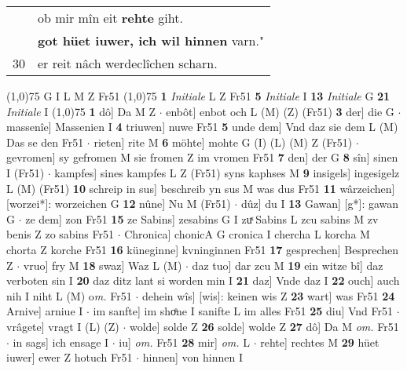 \documentclass[8pt,a4paper,notitlepage]{article}
\begin{document}
\begin{table}[ht]
\begin{minipage}[t]{0.5\linewidth}
\begin{tabular}{rl}
 & ob mir mîn eit \textbf{rehte} giht.\\ 
 & \textbf{got hüet iuwer, ich wil hinnen} varn."\\ 
30 & er reit nâch werdeclîchen scharn.\\ 
\end{tabular}
\scriptsize
\line(1,0){75} \newline
G I L M Z Fr51 \newline
\line(1,0){75} \newline
\textbf{1} \textit{Initiale} L Z Fr51  \textbf{5} \textit{Initiale} I  \textbf{13} \textit{Initiale} G  \textbf{21} \textit{Initiale} I  \newline
\line(1,0){75} \newline
\textbf{1} dô] Da M Z  $\cdot$ enbôt] enbot och L (M) (Z) (Fr51) \textbf{3} der] die G  $\cdot$ massenîe] Massenien I \textbf{4} triuwen] nuwe Fr51 \textbf{5} unde dem] Vnd daz sie dem L (M) Das se den Fr51  $\cdot$ rieten] rite M \textbf{6} möhte] mohte G (I) (L) (M) Z (Fr51)  $\cdot$ gevromen] sy gefromen M sie fromen Z im vromen Fr51 \textbf{7} den] der G \textbf{8} sîn] sinen I (Fr51)  $\cdot$ kampfes] sines kampfes L Z (Fr51) syns kaphses M \textbf{9} insigels] ingesigelz L (M) (Fr51) \textbf{10} schreip in sus] beschreib yn sus M was dus Fr51 \textbf{11} wârzeichen] [worzei*]: worzeichen G \textbf{12} nûne] Nu M (Fr51)  $\cdot$ dûz] du I \textbf{13} Gawan] [g*]: gawan G  $\cdot$ ze dem] zon Fr51 \textbf{15} ze Sabins] zesabins G I zuͯ Sabins L zcu sabins M zv benis Z zo sabins Fr51  $\cdot$ Chronica] chonicA G cronica I chercha L korcha M chorta Z korche Fr51 \textbf{16} küneginne] kvninginnen Fr51 \textbf{17} gesprechen] Besprechen Z  $\cdot$ vruo] fry M \textbf{18} swaz] Waz L (M)  $\cdot$ daz tuo] dar zcu M \textbf{19} ein witze bî] daz verboten sin I \textbf{20} daz ditz lant si worden min I \textbf{21} daz] Vnde daz I \textbf{22} ouch] auch nih I niht L (M) o\textit{m. } Fr51  $\cdot$ dehein wîs] [wis]: keinen wis Z \textbf{23} wart] was Fr51 \textbf{24} Arnive] arniue I  $\cdot$ im sanfte] im shoͤne I sanifte L im alles Fr51 \textbf{25} diu] Vnd Fr51  $\cdot$ vrâgete] vragt I (L) (Z)  $\cdot$ wolde] solde Z \textbf{26} solde] wolde Z \textbf{27} dô] Da M \textit{om.} Fr51  $\cdot$ in sags] ich ensage I  $\cdot$ iu] \textit{om.} Fr51 \textbf{28} mir] \textit{om.} L  $\cdot$ rehte] rechtes M \textbf{29} hüet iuwer] ewer Z hotuch Fr51  $\cdot$ hinnen] von hinnen I \newline
\end{minipage}
\hspace{0.5cm}

\end{table}
\end{document}
